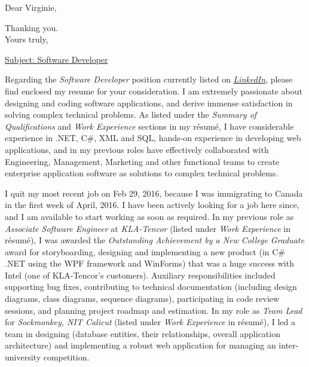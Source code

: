 \date{September 23, 2016}
\date{\today}
\opening{Dear Virginie,}
\closing{Thanking you.\\Yours truly,}
\makelettertitle

\underline{Subject: Software Developer}
\newline 

Regarding the \emph{Software Developer} position currently listed on \href{https://www.linkedin.com/jobs/view/226271198?refId=770f51b6-4612-4a3c-ab05-afdfe29835b7}{\emph{LinkedIn}}, please find enclosed my resume for your consideration. I am extremely passionate about designing and coding software applications, and derive immense satisfaction in solving complex technical problems. As listed under the \emph{Summary of Qualifications} and \emph{Work Experience} sections in my résumé, I have considerable experience in .NET, C\#, XML and  SQL, hands-on experience in developing web applications, and in my previous roles have effectively collaborated with Engineering, Management, Marketing and other functional teams to create enterprise application software as solutions to complex technical problems.

I quit my most recent job on Feb 29, 2016, because I was immigrating to Canada in the first week of April, 2016. I have been actively looking for a job here since, and I am available to start working as soon as required. In my previous role as \emph{Associate Software Engineer} at \emph{KLA-Tencor} (listed under \emph{Work Experience} in résumé), I was awarded the \emph{Outstanding Achievement by a New College Graduate} award for storyboarding, designing and implementing a new product (in C\# .NET using the WPF framework and WinForms) that was a huge success with Intel (one of KLA-Tencor's customers). Auxiliary responsibilities included supporting bug fixes, contributing to technical documentation (including design diagrams, class diagrams, sequence diagrams), participating in code review sessions, and planning project roadmap and estimation. In my role as \emph{Team Lead} for \emph{Sockmonkey, NIT Calicut} (listed under \emph{Work Experience} in résumé), I led a team in designing (database entities, their relationships, overall application architecture) and implementing a robust web application for managing an inter-university competition.


